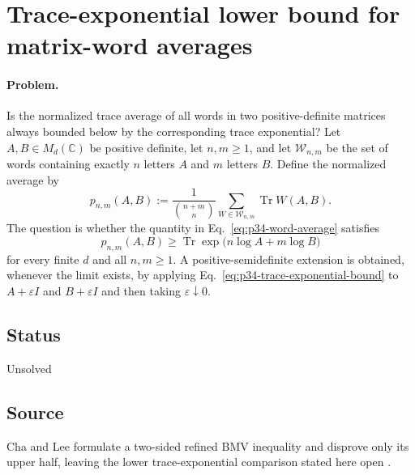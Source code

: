 \section{Trace-exponential lower bound for matrix-word averages}
\label{sec:op_6cb323ea3ec0b70e}

\paragraph{Problem.}
Is the normalized trace average of all words in two positive-definite matrices
always bounded below by the corresponding trace exponential?  Let
$A,B\in M_d(\mathbb C)$ be positive definite, let $n,m\geq1$, and let
$\mathcal W_{n,m}$ be the set of words containing exactly $n$ letters $A$ and
$m$ letters $B$.  Define the normalized average by
\begin{equation}
  p_{n,m}(A,B)
  :=\frac{1}{\binom{n+m}{n}}
    \sum_{W\in\mathcal W_{n,m}}\operatorname{Tr}W(A,B).
  \label{eq:p34-word-average}
\end{equation}
The question is whether the quantity in Eq.~\eqref{eq:p34-word-average}
satisfies
\begin{equation}
  p_{n,m}(A,B)
  \geq \operatorname{Tr}\exp\!\bigl(n\log A+m\log B\bigr)
  \label{eq:p34-trace-exponential-bound}
\end{equation}
for every finite $d$ and all $n,m\geq1$.  A positive-semidefinite extension
is obtained, whenever the limit exists, by applying
Eq.~\eqref{eq:p34-trace-exponential-bound} to $A+\varepsilon I$ and
$B+\varepsilon I$ and then taking $\varepsilon\downarrow0$.

\subsection*{Status}

Unsolved

\subsection*{Source}

Cha and Lee formulate a two-sided refined BMV inequality and disprove only
its upper half, leaving the lower trace-exponential comparison stated here
open .

